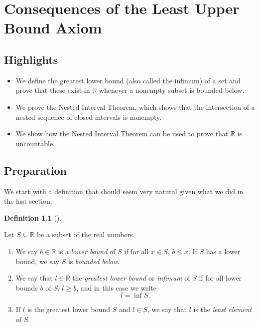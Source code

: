 \documentclass[
  letterpaper,
  DIV=11,
  numbers=noendperiod]{scrreprt}
\providecommand{\tightlist}{%
  \setlength{\itemsep}{0pt}\setlength{\parskip}{0pt}}
\def\R{\mathbb R}
\theoremstyle{plain}
\theoremstyle{definition}
\theoremstyle{plain}
\theoremstyle{plain}
\theoremstyle{definition}
\theoremstyle{definition}
\newtheorem{definition}{Definition}[chapter]
\theoremstyle{remark}
\begin{document}
\chapter{Consequences of the Least Upper Bound
Axiom}\label{sec-lub-props}

\section*{Highlights}\label{highlights-2}


\begin{itemize}
\tightlist
\item
  We define the greatest lower bound (also called the infimum) of a set
  and prove that these exist in \(\R\) whenever a nonempty subset is
  bounded below.
\item
  We prove the Nested Interval Theorem, which shows that the
  intersection of a nested sequence of closed intervals is nonempty.
\item
  We show how the Nested Interval Theorem can be used to prove that
  \(\R\) is uncountable.
\end{itemize}

\section*{Preparation}\label{preparation-2}


We start with a definition that should seem very natural given what we
did in the last section.

\begin{definition}[]\protect\hypertarget{def-inf}{}\label{def-inf}

Let \(S\subseteq\R\) be a subset of the real numbers.

\begin{enumerate}
\def\labelenumi{\arabic{enumi}.}
\item
  We say \(b\in\R\) is a \emph{lower bound} of \(S\) if for all
  \(x\in S\), \(b\leq x.\) If \(S\) has a lower bound, we say \(S\) is
  \emph{bounded below}.
\item
  We say that \(l\in\R\) the \emph{greatest lower bound} or
  \emph{infimum} of \(S\) if for all lower bounds \(b\) of \(S\),
  \(l\geq b\), and in this case we write \[l=\inf S.\]
\item
  If \(l\) is the greatest lower bound \(S\) and \(l\in S\), we say that
  \(l\) is the \emph{least element} of \(S.\)
\end{enumerate}

\end{definition}
\end{document}
